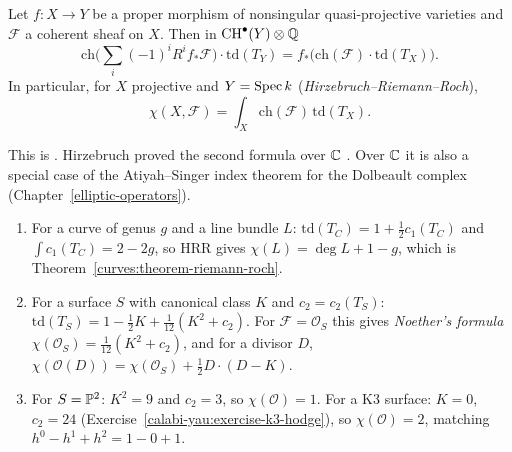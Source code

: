 \begin{theorem}\label{intersection-theory:theorem-grr}
Let $f \colon X \to Y$ be a proper morphism of nonsingular quasi-projective varieties and $\mathcal{F}$ a coherent sheaf on $X$. Then in $\operatorname{CH}^\bullet(Y) \otimes \mathbb{Q}$
\[
\mathrm{ch}\Big(\sum_i(-1)^iR^if_*\mathcal{F}\Big)\cdot\mathrm{td}(T_Y) = f_*\big(\mathrm{ch}(\mathcal{F})\cdot\mathrm{td}(T_X)\big).
\]
In particular, for $X$ projective and $Y = \operatorname{Spec} k$ (\emph{Hirzebruch--Riemann--Roch}),
\[
\chi(X, \mathcal{F}) = \int_X\mathrm{ch}(\mathcal{F})\,\mathrm{td}(T_X) .
\]
\end{theorem}

This is \cite[Theorem 15.2 and Corollary 15.2.1]{fulton-intersection}. Hirzebruch proved the second formula over $\mathbb{C}$ \cite{hirzebruch-topological}. Over $\mathbb{C}$ it is also a special case of
the Atiyah--Singer index theorem for the Dolbeault complex (Chapter~\ref{elliptic-operators}).

\begin{example}\label{intersection-theory:example-riemann-roch}
\begin{enumerate}
\item For a curve of genus $g$ and a line bundle $L$: $\mathrm{td}(T_C) = 1 + \frac12c_1(T_C)$ and $\int c_1(T_C) = 2 - 2g$, so HRR gives $\chi(L) = \deg L + 1 - g$, which is
Theorem~\ref{curves:theorem-riemann-roch}.
\item For a surface $S$ with canonical class $K$ and $c_2 = c_2(T_S)$: $\mathrm{td}(T_S) = 1 - \frac12K + \frac1{12}(K^2 + c_2)$. For $\mathcal{F} = \mathcal{O}_S$ this gives
\emph{Noether's formula} $\chi(\mathcal{O}_S) = \frac1{12}(K^2 + c_2)$, and for a divisor $D$,
$\chi(\mathcal{O}(D)) = \chi(\mathcal{O}_S) + \frac12D\cdot(D - K)$.
\item For $S = \mathbb{P}^2$: $K^2 = 9$ and $c_2 = 3$, so $\chi(\mathcal{O}) = 1$. For a K3 surface: $K = 0$, $c_2 = 24$ (Exercise~\ref{calabi-yau:exercise-k3-hodge}), so $\chi(\mathcal{O}) = 2$,
matching $h^0 - h^1 + h^2 = 1 - 0 + 1$.
\end{enumerate}
\end{example}

